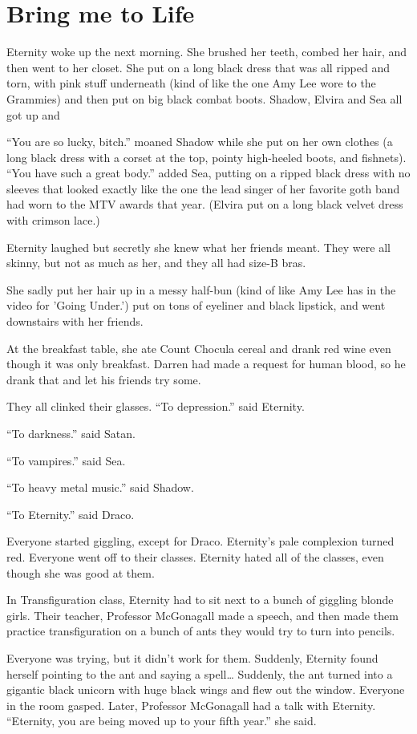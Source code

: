 \section{Bring me to Life}

\begin{sloppypar}
    Eternity woke up the next morning. She brushed her teeth, combed her hair, and then went to her closet. She put on a long black dress that was all ripped and torn, with pink stuff underneath (kind of like the one Amy Lee wore to the Grammies) and then put on big black combat boots. Shadow, Elvira and Sea all got up and
\end{sloppypar}

\enquote{You are so lucky, bitch.} moaned Shadow while she put on her own clothes (a long black dress with a corset at the top, pointy high-heeled boots, and fishnets). \enquote{You have such a great body.} added Sea, putting on a ripped black dress with no sleeves that looked exactly like the one the lead singer of her favorite goth band had worn to the MTV awards that year. (Elvira put on a long black velvet dress with crimson lace.)

Eternity laughed but secretly she knew what her friends meant. They were all skinny, but not as much as her, and they all had size-B bras.

She sadly put her hair up in a messy half-bun (kind of like Amy Lee has in the video for 'Going Under.') put on tons of eyeliner and black lipstick, and went downstairs with her friends.

\begin{sloppypar}
    At the breakfast table, she ate Count Chocula cereal and drank red wine even though it was only breakfast. Darren had made a request for human blood, so he drank that and let his friends try some.
\end{sloppypar}

They all clinked their glasses. \enquote{To depression.} said Eternity.

\enquote{To darkness.} said Satan.

\enquote{To vampires.} said Sea.

\enquote{To heavy metal music.} said Shadow.

\enquote{To Eternity.} said Draco.

Everyone started giggling, except for Draco. Eternity's pale complexion turned red. Everyone went off to their classes. Eternity hated all of the classes, even though she was good at them.

In Transfiguration class, Eternity had to sit next to a bunch of giggling blonde girls. Their teacher, Professor McGonagall made a speech, and then made them practice transfiguration on a bunch of ants they would try to turn into pencils.

Everyone was trying, but it didn't work for them. Suddenly, Eternity found herself pointing to the ant and saying a spell… Suddenly, the ant turned into a gigantic black unicorn with huge black wings and flew out the window. Everyone in the room gasped. Later, Professor McGonagall had a talk with Eternity. \enquote{Eternity, you are being moved up to your fifth year.} she said.